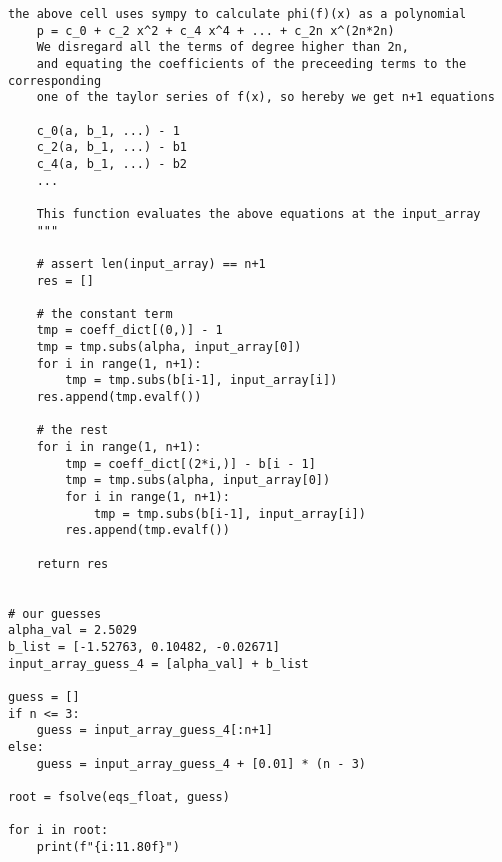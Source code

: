 \begin{lstlisting}[style=python]
    the above cell uses sympy to calculate phi(f)(x) as a polynomial
    p = c_0 + c_2 x^2 + c_4 x^4 + ... + c_2n x^(2n*2n)
    We disregard all the terms of degree higher than 2n,
    and equating the coefficients of the preceeding terms to the corresponding
    one of the taylor series of f(x), so hereby we get n+1 equations 

    c_0(a, b_1, ...) - 1 
    c_2(a, b_1, ...) - b1 
    c_4(a, b_1, ...) - b2
    ...

    This function evaluates the above equations at the input_array
    """

    # assert len(input_array) == n+1
    res = []

    # the constant term
    tmp = coeff_dict[(0,)] - 1
    tmp = tmp.subs(alpha, input_array[0])
    for i in range(1, n+1):
        tmp = tmp.subs(b[i-1], input_array[i])
    res.append(tmp.evalf())

    # the rest
    for i in range(1, n+1):
        tmp = coeff_dict[(2*i,)] - b[i - 1]
        tmp = tmp.subs(alpha, input_array[0])
        for i in range(1, n+1):
            tmp = tmp.subs(b[i-1], input_array[i])
        res.append(tmp.evalf())

    return res


# our guesses
alpha_val = 2.5029
b_list = [-1.52763, 0.10482, -0.02671]
input_array_guess_4 = [alpha_val] + b_list

guess = []
if n <= 3:
    guess = input_array_guess_4[:n+1]
else:
    guess = input_array_guess_4 + [0.01] * (n - 3)

root = fsolve(eqs_float, guess)

for i in root:
    print(f"{i:11.80f}")
\end{lstlisting}\label{fsolve}

